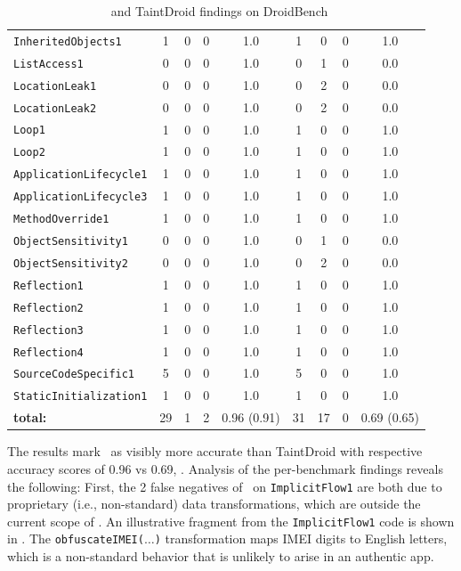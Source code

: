 \begin{table}
\begin{small}
\begin{center}
\begin{tabular}{l|c|c|c|c|c|c|c|c}
	{\tt InheritedObjects1} 				& 1 & 0 & 0 & 1.0 & 1 & 0 & 0 & 1.0 \\
	{\tt ListAccess1} 						& 0 & 0 & 0 & 1.0 & 0 & 1 & 0 & 0.0 \\
	{\tt LocationLeak1} 					& 0 & 0 & 0 & 1.0 & 0 & 2 & 0 & 0.0 \\
	{\tt LocationLeak2} 					& 0 & 0 & 0 & 1.0 & 0 & 2 & 0 & 0.0 \\
	{\tt Loop1} 									& 1 & 0 & 0 & 1.0 & 1 & 0 & 0 & 1.0 \\
	{\tt Loop2} 									& 1 & 0 & 0 & 1.0 & 1 & 0 & 0 & 1.0 \\
	{\tt ApplicationLifecycle1} 			& 1 & 0 & 0 & 1.0 & 1 & 0 & 0 & 1.0 \\
	{\tt ApplicationLifecycle3} 			& 1 & 0 & 0 & 1.0 & 1 & 0 & 0 & 1.0 \\
	{\tt MethodOverride1} 				& 1 & 0 & 0 & 1.0 & 1 & 0 & 0 & 1.0 \\
	{\tt ObjectSensitivity1} 				& 0 & 0 & 0 & 1.0 & 0 & 1 & 0 & 0.0 \\
	{\tt ObjectSensitivity2} 				& 0 & 0 & 0 & 1.0 & 0 & 2 & 0 & 0.0 \\
	{\tt Reflection1} 							& 1 & 0 & 0 & 1.0 & 1 & 0 & 0 & 1.0 \\
	{\tt Reflection2} 							& 1 & 0 & 0 & 1.0 & 1 & 0 & 0 & 1.0 \\
	{\tt Reflection3} 							& 1 & 0 & 0 & 1.0 & 1 & 0 & 0 & 1.0 \\
	{\tt Reflection4} 							& 1 & 0 & 0 & 1.0 & 1 & 0 & 0 & 1.0 \\
	{\tt SourceCodeSpecific1} 		& 5 & 0 & 0 & 1.0 & 5 & 0 & 0 & 1.0 \\
	{\tt StaticInitialization1} 				& 1 & 0 & 0 & 1.0 & 1 & 0 & 0 & 1.0 \\
	\hline \hline
	{\bf total:}	& 29 & 1 & 2 & 0.96 (0.91) & 31 & 17 & 0 & 0.69 (0.65)
	\end{tabular}
	\end{center}
	\caption{\label{Ta:accuracyDBench}\Tool\ and TaintDroid findings on DroidBench}
\end{small}
\end{table}

The results mark \Tool\ as visibly more accurate than TaintDroid with respective accuracy scores of 0.96 vs 0.69, . Analysis of the per-benchmark findings reveals the following: First, the 2 false negatives of 
\Tool\ on {\tt ImplicitFlow1} are both due to proprietary (i.e., non-standard) data transformations, which are outside the current scope of \Tool. An illustrative fragment from the {\tt ImplicitFlow1} code is shown in . The {\tt obfuscateIMEI($\ldots$)} transformation maps IMEI digits to English letters, which is a non-standard behavior that is unlikely to arise in an authentic app.

